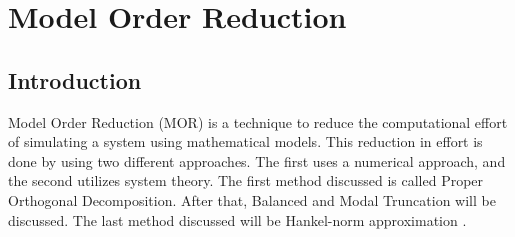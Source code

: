 \nopagebreak
\chapter{Model Order Reduction}
\section{Introduction}
Model Order Reduction (MOR) is a technique to reduce the computational effort of simulating a system using mathematical models.
This reduction in effort is done by using two different approaches. The first uses a numerical approach, and the second utilizes system theory.
The first method discussed is called Proper Orthogonal Decomposition. After that, Balanced and Modal Truncation will be discussed.
The last method discussed will be Hankel-norm approximation \cite{+2021}.